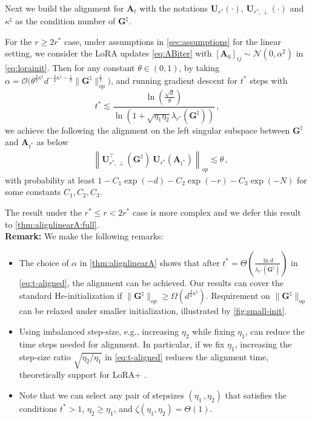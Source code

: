 Next we build the alignment for $\bm A_t$ with the notations $\bm U_{r^*}(\cdot)$, $\bm U_{r^*,\perp}(\cdot)$ and $\kappa^{\natural}$ as the condition number of ${\bm G}^{\natural}$.
\begin{theorem}\label{thm:alignlinearA}
    For the $r \geq 2r^*$ case, under assumptions in \cref{sec:assumptions} for the linear setting, we consider the LoRA updates \eqref{eq:ABiter} with $[\bm A_0]_{ij} \sim \mathcal{N}(0, \alpha^2)$ in \eqref{eq:lorainit}.
    Then for any constant $\theta \in (0,1)$, by taking $\alpha = \mathcal{O}\Big(\theta^{\frac{3}{2}\kappa^\natural} d^{-\frac{3}{4}\kappa^\natural-\frac{1}{2}}\| {\bm G}^{\natural}\|^{\frac{1}{2}}_{op}\Big)$, 
and running gradient descent for $t^*$ steps with 
\begin{equation}\label{eq:t-aligned}
  t^* \lesssim \frac{\ln\left(\frac{\sqrt{d}}{\theta}\right)}{\ln\left(1+\sqrt{\eta_1 \eta_2}\lambda_{r^*}\left({\bm G}^{\natural}\right)\right)} \,,
\end{equation}
we achieve the following the alignment on the left singular subspace between $\bm G^{\natural}$ and $\bm A_{t^*}$ as below
    \begin{align}\label{eq:align-t-main}
        &\left\|\bm U^{\!\top}_{r^*,\perp}( \bm G^{\natural})~\bm U_{r^*}\left(\bm A_{t^*}\right)\right\|_{op} \lesssim \theta\,,
    \end{align}
    with probability at least $1 - C_1\exp(- d) -C_2\exp(- r) -C_3\exp(- N)$ for some constants $C_1, C_2, C_3$.
\end{theorem}
The result under the $r^* \leq r < 2r^*$ case is more complex and we defer this result to \cref{thm:alignlinearA:full}.\\


\noindent
{\bf Remark:} 
We make the following remarks:
\begin{itemize}
    \item The choice of $\alpha$ in \cref{thm:alignlinearA} shows that  after $t^* = \Theta\left(\frac{\ln d}{\lambda_{r^*}(\bm G^{\natural})}\right)$ in \cref{eq:t-aligned}, the alignment can be achieved. Our results can cover the standard He-initialization \citep{he2015delving} if $\| \bm G^{\natural}\|_{op} \geq \Omega\left(d^{\frac{3}{4}\kappa^\natural}\right)$. Requirement on $\| \bm G^{\natural}\|_{op}$ can be relaxed under smaller initialization, illustrated by \cref{fig:small-init}.
    \item Using imbalanced step-size, e.g., increasing $\eta_2$ while fixing $\eta_1$, can reduce the time steps needed for alignment. In particular, if we fix $\eta_1$, increasing the step-size ratio $\sqrt{\eta_2/\eta_1}$ in \cref{eq:t-aligned} reduces the alignment time, theoretically support for LoRA+ \citep{hayou2024lora+}.
    \item Note that we can select any pair of stepsizes $(\eta_1\,,\eta_2)$ that satisfies the conditions $t^*>1$, $\eta_2 \geq \eta_1$, and $\zeta(\eta_1, \eta_2) = \Theta(1)$.
\end{itemize}


